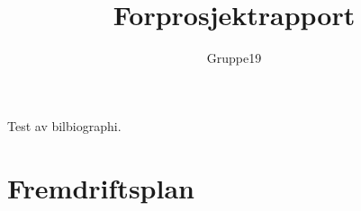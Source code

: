 \documentclass[11pt,a4paper,titlepage]{report}
\author{Gruppe19}
\title{Forprosjektrapport}
\begin{document}
\maketitle
\tableofcontents










Test av bilbiographi\cite{book:unixprog}.





\appendix
\chapter{Fremdriftsplan}
\end{document}
